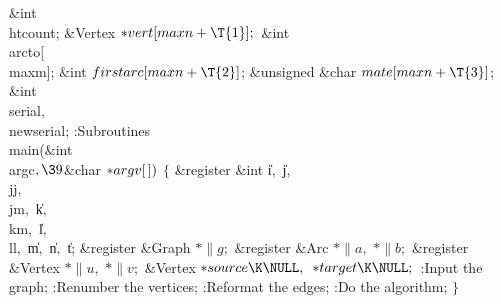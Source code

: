 \&{int} \\{htcount};\6
\&{Vertex} ${}{*}\\{vert}[\\{maxn}+\T{1}];{}$\6
\&{int} \\{arcto}[\\{maxm}];\6
\&{int} ${}\\{firstarc}[\\{maxn}+\T{2}]{}$;\6
\&{unsigned} \&{char} ${}\\{mate}[\\{maxn}+\T{3}]{}$;\6
\&{int} \\{serial}${},{}$ \\{newserial};\7
:Subroutines\X\7
\\{main}(\&{int} \\{argc}${},\39{}$\&{char} ${}{*}\\{argv}[\,]){}$\1\1\2\2\6
${}\{{}$\1\6
\&{register} \&{int} \|i${},{}$ \|j${},{}$ \\{jj}${},{}$ \\{jm}${},{}$ %
\|k${},{}$ \\{km}${},{}$ \|l${},{}$ \\{ll}${},{}$ \|m${},{}$ \|n${},{}$ \|t;\6
\&{register} \&{Graph} ${}{*}\|g;{}$\6
\&{register} \&{Arc} ${}{*}\|a,{}$ ${}{*}\|b;{}$\6
\&{register} \&{Vertex} ${}{*}\|u,{}$ ${}{*}\|v;{}$\6
\&{Vertex} ${}{*}\\{source}\K\NULL,{}$ ${}{*}\\{target}\K\NULL;{}$\7
:Input the graph\X;\6
:Renumber the vertices\X;\6
:Reformat the edges\X;\6
:Do the algorithm\X;\6
\4${}\}{}$\2\par
\fi


